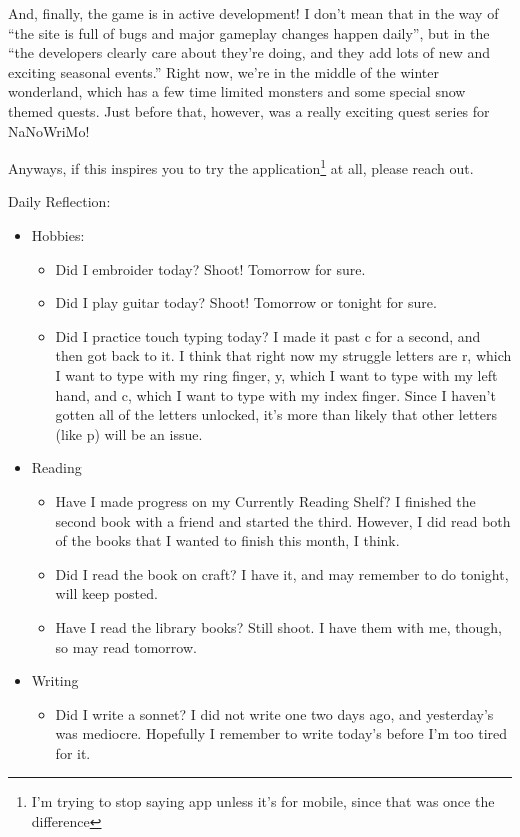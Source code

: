 \documentclass[12pt]{article}[titlepage]
\newcommand{\say}[1]{``#1''}
\renewcommand{\,}{\textsuperscript{,}}
\begin{document}
And, finally, the game is in active development!
I don't mean that in the way of \say{the site is full of bugs and major gameplay changes happen daily}, but in the \say{the developers clearly care about they're doing, and they add lots of new and exciting seasonal events.}
Right now, we're in the middle of the winter wonderland, which has a few time limited monsters and some special snow themed quests.
Just before that, however, was a really exciting quest series for NaNoWriMo!

Anyways, if this inspires you to try the application\footnote{I'm trying to stop saying app unless it's for mobile, since that was once the difference} at all, please reach out.

Daily Reflection:
\begin{itemize}
\item Hobbies:
\begin{itemize}
\item Did I embroider today? Shoot! Tomorrow for sure.
\item Did I play guitar today? Shoot! Tomorrow or tonight for sure.
\item Did I practice touch typing today? I made it past c for a second, and then got back to it. I think that right now my struggle letters are r, which I want to type with my ring finger, y, which I want to type with my left hand, and c, which I want to type with my index finger.
Since I haven't gotten all of the letters unlocked, it's more than likely that other letters (like p) will be an issue.
\end{itemize}
\item Reading
\begin{itemize}
\item Have I made progress on my Currently Reading Shelf? I finished the second book with a friend and started the third. However, I did read both of the books that I wanted to finish this month, I think.
\item Did I read the book on craft? I have it, and may remember to do tonight, will keep posted.
\item Have I read the library books? Still shoot. I have them with me, though, so may read tomorrow.
\end{itemize}
\item Writing
\begin{itemize}
\item Did I write a sonnet? I did not write one two days ago, and yesterday's was mediocre. Hopefully I remember to write today's before I'm too tired for it.

\end{itemize}
\end{itemize}
\end{document}

